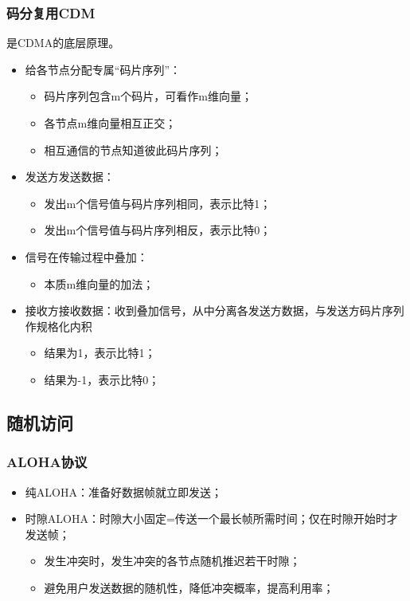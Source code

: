 \subsubsection{码分复用CDM}
是CDMA的底层原理。

\begin{itemize}
    \item 给各节点分配专属“码片序列”：\begin{itemize}
        \item 码片序列包含m个码片，可看作m维向量；
        \item 各节点m维向量相互正交；
        \item 相互通信的节点知道彼此码片序列；
    \end{itemize}
    \item 发送方发送数据：\begin{itemize}
        \item 发出m个信号值与码片序列相同，表示比特1；
        \item 发出m个信号值与码片序列相反，表示比特0；
    \end{itemize}
    \item 信号在传输过程中叠加：\begin{itemize}
        \item 本质m维向量的加法；
    \end{itemize}
    \item 接收方接收数据：收到叠加信号，从中分离各发送方数据，与发送方码片序列作规格化内积\begin{itemize}
        \item 结果为1，表示比特1；
        \item 结果为-1，表示比特0；
    \end{itemize}
\end{itemize}


\subsection{随机访问}

\subsubsection{ALOHA协议}
\begin{itemize}
    \item 纯ALOHA：准备好数据帧就立即发送；
    \item 时隙ALOHA：时隙大小固定=传送一个最长帧所需时间；仅在时隙开始时才发送帧；\begin{itemize}
        \item 发生冲突时，发生冲突的各节点随机推迟若干时隙；
        \item 避免用户发送数据的随机性，降低冲突概率，提高利用率；
    \end{itemize}
\end{itemize}



